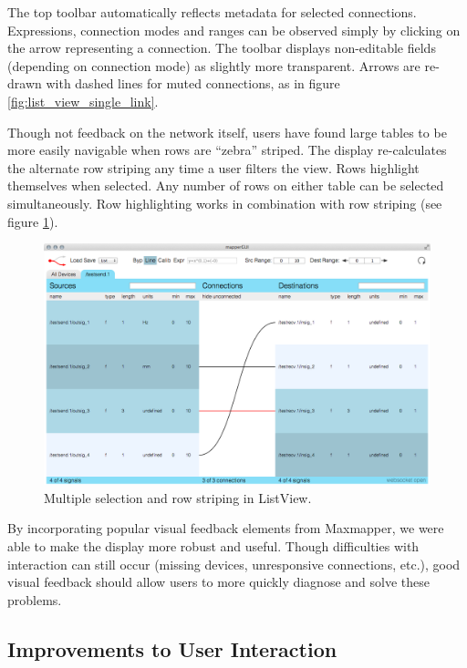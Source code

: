 The top toolbar automatically reflects metadata for selected connections. Expressions, connection modes and ranges can be observed simply by clicking on the arrow representing a connection. The toolbar displays non-editable fields (depending on connection mode) as slightly more transparent. Arrows are re-drawn with dashed lines for muted connections, as in figure \ref{fig:list_view_single_link}.

Though not feedback on the network itself, users have found large tables to be more easily navigable when rows are ``zebra'' striped. The display re-calculates the alternate row striping any time a user filters the view. Rows highlight themselves when selected. Any number of rows on either table can be selected simultaneously. Row highlighting works in combination with row striping (see figure \ref{fig:row_striping}).

\begin{figure}[!h]
	\centering
	\includegraphics[width=1\textwidth]{figures/row_striping}
	\caption{Multiple selection and row striping in ListView.}
	\label{fig:row_striping}
\end{figure}

By incorporating popular visual feedback elements from Maxmapper, we were able to make the display more robust and useful. Though difficulties with interaction can still occur (missing devices, unresponsive connections, etc.), good visual feedback should allow users to more quickly diagnose and solve these problems.


	\subsection{Improvements to User Interaction} %
	\label{sub:improvements_to_user_interaction}

